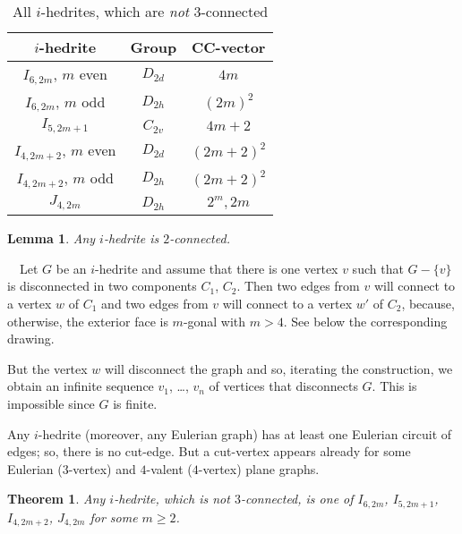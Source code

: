 \documentclass[12pt]{article}
\newtheorem{theorem}{Theorem}
\newtheorem{lemma}{Lemma}
\newcommand{\proof}{\noindent{\bf Proof.}\ \ }
\begin{document}
\begin{table}
\centering
\epsfxsize=100mm
\\[2mm]
\begin{tabular}{||c|c|c||}
\hline\hline
$i$-hedrite            &Group      &CC-vector\\\hline\hline
$I_{6,2m}$, $m$ even   &$D_{2d}$   &$4m$\\\hline
$I_{6,2m}$, $m$ odd    &$D_{2h}$   &$(2m)^2$\\\hline
$I_{5,2m+1}$           &$C_{2v}$   &$4m+2$\\\hline
$I_{4,2m+2}$, $m$ even &$D_{2d}$   &$(2m+2)^2$\\\hline
$I_{4,2m+2}$, $m$ odd  &$D_{2h}$   &$(2m+2)^2$\\\hline
$J_{4,2m}$             &$D_{2h}$   &$2^m, 2m$\\\hline\hline
\end{tabular}
\caption{All $i$-hedrites, which are {\em not} $3$-connected}
\label{FundamentalInfo}
\end{table}



\begin{lemma}
Any $i$-hedrite is $2$-connected.
\end{lemma}
\proof Let $G$ be an $i$-hedrite and assume that there is one vertex $v$ such that $G-\{v\}$ is disconnected in two components $C_1$, $C_2$. Then two edges from $v$ will connect to a vertex $w$ of $C_1$ and two edges from $v$ will connect to a vertex $w'$ of $C_2$, because, otherwise, the exterior face is $m$-gonal with $m>4$. See below the corresponding drawing.

\begin{center}
\epsfxsize=60mm
\end{center}

But the vertex $w$ will disconnect the graph and so, iterating the construction, we obtain an infinite sequence $v_1$, \dots, $v_n$ of vertices that disconnects $G$. 
This is impossible since $G$ is finite.


Any $i$-hedrite (moreover, any Eulerian graph) has at least one 
Eulerian circuit of edges; so, there is no cut-edge.
But a cut-vertex appears already for some Eulerian ($3$-vertex)
and $4$-valent ($4$-vertex) plane graphs.


\begin{theorem}\label{3-connectedness}
Any $i$-hedrite, which is not $3$-connected, is one of $I_{6,2m}$, $I_{5, 2m+1}$, $I_{4, 2m+2}$, $J_{4, 2m}$ for some $m\geq 2$.


\end{theorem}
\end{document}
